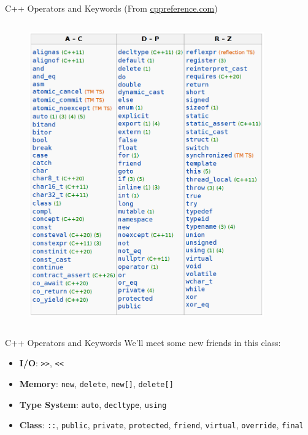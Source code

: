 \begin{frame}[fragile]{C++ Operators and Keywords (From \textcolor{blue}{\href{https://en.cppreference.com/w/cpp/language/}{cppreference.com}})}
\begin{columns}
\begin{column}{0.4\textwidth}
\begin{figure}
                \includegraphics[width=0.9\textwidth]{day8_pm/img/1-keywords}
            \end{figure}
        \end{column}
    \end{columns}
\end{frame}

\begin{frame}[fragile]{ C++ Operators and Keywords}
    We'll meet some new friends in this class:
    \begin{itemize}
        \item \textbf{I/O}:  \texttt{>>}, \texttt{<<}
        \item \textbf{Memory}: \texttt{new}, \texttt{delete}, \texttt{new[]}, \texttt{delete[]}
        \item \textbf{Type System}: \texttt{auto}, \texttt{decltype}, \texttt{using}
        \item \textbf{Class}: \texttt{::}, \texttt{public}, \texttt{private}, \texttt{protected}, \texttt{friend}, \texttt{virtual}, \texttt{override}, \texttt{final}
    \end{itemize}
\end{frame}
    
